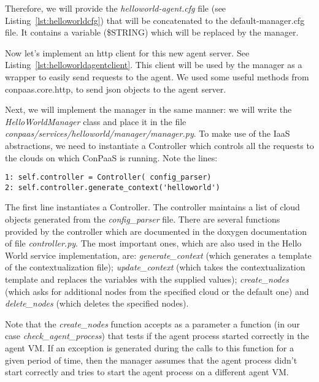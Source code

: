 \documentclass[10pt]{article}
\newcommand{\ConPaaSHOME}{../conpaas-services}
\begin{document}
Therefore, we will provide the \textit{helloworld-agent.cfg} file (see Listing~\ref{lst:helloworldcfg}) that will be concatenated to the default-manager.cfg file. It contains a variable (\$STRING) which will be replaced by the manager.
 


Now let's implement an http client for this new agent server. See Listing~\ref{lst:helloworldagentclient}. This client will be used by the manager as a wrapper to easily send requests to the agent. We used some useful methods from conpaas.core.http, to send json objects to the agent server. 



Next, we will implement the manager in the same manner: we will write the \textit{HelloWorldManager} class and place it in the file \textit{conpaas/services/helloworld/manager/manager.py}. To make use of the IaaS abstractions, we need to instantiate a Controller which controls all the requests to the clouds on which ConPaaS is running. Note the lines: 

\begin{lstlisting}
1: self.controller = Controller( config_parser)
2: self.controller.generate_context('helloworld')
\end{lstlisting}

The first line instantiates a Controller. The controller maintains a list of cloud objects generated from the \textit{config\_parser} file. There are several functions provided by the controller which are documented in the doxygen documentation of file \textit{controller.py}. The most important ones, which are also used in the Hello World service implementation, are: \textit{generate\_context} (which generates a template of the contextualization file); \textit{update\_context} (which takes the contextualization template and replaces the variables with the supplied values); \textit{create\_nodes} (which asks for additional nodes from the specified cloud or the default one) and \textit{delete\_nodes} (which deletes the specified nodes).

Note that the \textit{create\_nodes} function accepts as a parameter a function (in our case \textit{check\_agent\_process}) that tests if the agent process started correctly in the agent VM. If an exception is generated during the calls to this function for a given period of time, then the manager assumes that the agent process didn't start correctly and tries to start the agent process on a different agent VM.   
\end{document}
